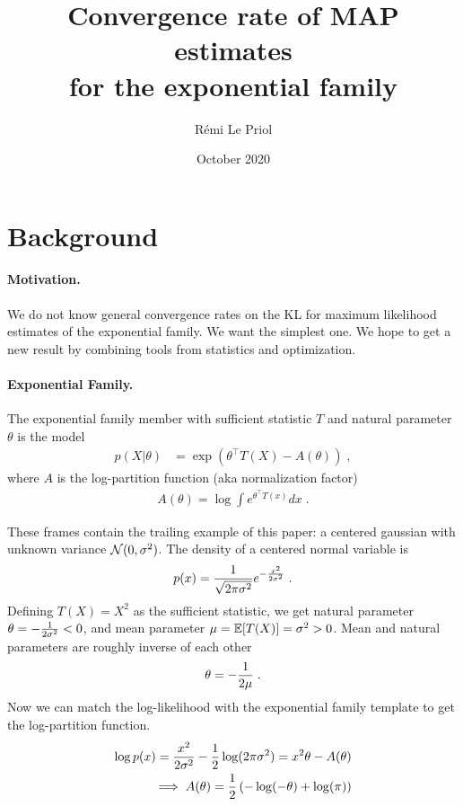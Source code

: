 \documentclass{article}
\title{Convergence rate of MAP estimates \\
for the exponential family}
\author{R\'emi Le Priol}
\date{October 2020}
\newenvironment{example}{
	\begin{mdframed}[backgroundcolor=light-gray, roundcorner=5pt]
}{		
	\end{mdframed}
}
\newcommand{\logpart}{A}
\newcommand{\natp}{\theta}
\begin{document}
\maketitle

\section{Background}

\paragraph{Motivation.} 
We do not know general convergence rates on the KL for maximum likelihood estimates of the exponential family.
We want the simplest one.
We hope  to get a new result by combining tools from statistics and optimization. 
\paragraph{Exponential Family.}
The exponential family member with sufficient statistic $T$ and natural parameter $\natp$ is the model 
\begin{align}
    p(X|\natp) &= \exp( \natp^\top T(X) - \logpart(\natp)) \; ,
\end{align}
where $\logpart$ is the log-partition function (aka normalization factor) 
\begin{align}
    \logpart(\natp) = \log \int e^{\natp^\top T(x)} dx \; .
\end{align}

\begin{example}
	These frames contain the trailing example of this paper: a centered gaussian with unknown variance ${\mathcal N}(0,\sigma^2)$.
	The density of a centered normal variable is
\begin{align}
	p(x) = \frac{1}{\sqrt{2\pi \sigma^2}} e^{-\frac{x^2}{2 \sigma^2}} \; .
\end{align}
Defining $T(X)=X^2$ as the sufficient statistic, we get natural parameter $\natp = -\inv{2 \sigma^2} <0$, and mean parameter $\mu=\operatorname{\mathbb{E}}[T(X)] = \sigma^2 >0$. 
Mean and natural parameters are roughly inverse of each other
\begin{align}
	\natp = -\inv{2 \mu}\; .
\end{align}
Now we can match the log-likelihood with the exponential family template to get the log-partition function.
\begin{align}
	\log p(x) = \frac{x^2}{2 \sigma^2} - \half \log(2 \pi \sigma^2 ) 
	= x^2 \natp - \logpart(\natp) \\
	\implies \logpart (\natp) = \half \left( -\log(-\natp)  + \log(\pi) \right)
\end{align}
\end{example}
\end{document}
